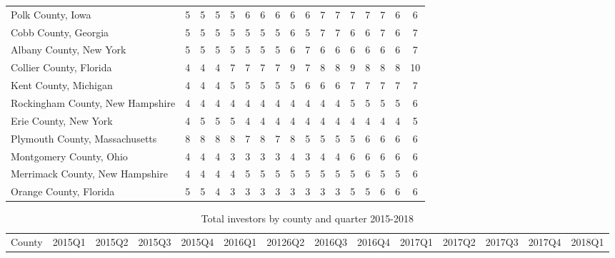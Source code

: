 \begin{landscape}
\begin{longtable}{lcccccccccccccccc}
	Polk County, Iowa & 5 & 5 & 5 & 5 & 6 & 6 & 6 & 6 & 6 & 7 & 7 & 7 & 7 & 7 & 6 & 6 \\
	Cobb County, Georgia & 5 & 5 & 5 & 5 & 5 & 5 & 5 & 6 & 5 & 7 & 7 & 6 & 6 & 7 & 6 & 7 \\
	Albany County, New York & 5 & 5 & 5 & 5 & 5 & 5 & 5 & 6 & 7 & 6 & 6 & 6 & 6 & 6 & 6 & 7 \\
	Collier County, Florida & 4 & 4 & 4 & 7 & 7 & 7 & 7 & 9 & 7 & 8 & 8 & 9 & 8 & 8 & 8 & 10 \\
	Kent County, Michigan & 4 & 4 & 4 & 5 & 5 & 5 & 5 & 5 & 6 & 6 & 6 & 7 & 7 & 7 & 7 & 7 \\
	Rockingham County, New Hampshire & 4 & 4 & 4 & 4 & 4 & 4 & 4 & 4 & 4 & 4 & 4 & 5 & 5 & 5 & 5 & 6 \\
	Erie County, New York & 4 & 5 & 5 & 5 & 4 & 4 & 4 & 4 & 4 & 4 & 4 & 4 & 4 & 4 & 4 & 5 \\
	Plymouth County, Massachusetts & 8 & 8 & 8 & 8 & 7 & 8 & 7 & 8 & 5 & 5 & 5 & 5 & 6 & 6 & 6 & 6 \\
	Montgomery County, Ohio & 4 & 4 & 4 & 3 & 3 & 3 & 3 & 4 & 3 & 4 & 4 & 6 & 6 & 6 & 6 & 6 \\
	Merrimack County, New Hampshire & 4 & 4 & 4 & 4 & 5 & 5 & 5 & 5 & 5 & 5 & 5 & 5 & 6 & 5 & 5 & 6 \\
	Orange County, Florida & 5 & 5 & 4 & 3 & 3 & 3 & 3 & 3 & 3 & 3 & 3 & 5 & 5 & 6 & 6 & 6

\end{longtable}

\newpage

\begin{longtable}{lccccccccccccc}

	\caption[Total Investors by County and Quarter 2015-2018]{Total investors by county and quarter 2015-2018}\\
	County &2015Q1 &2015Q2 &2015Q3 &2015Q4 &2016Q1 &20126Q2 &2016Q3 &2016Q4 &2017Q1 & 2017Q2 &2017Q3 &2017Q4 &2018Q1 \\
	

\end{longtable}
\end{landscape}
